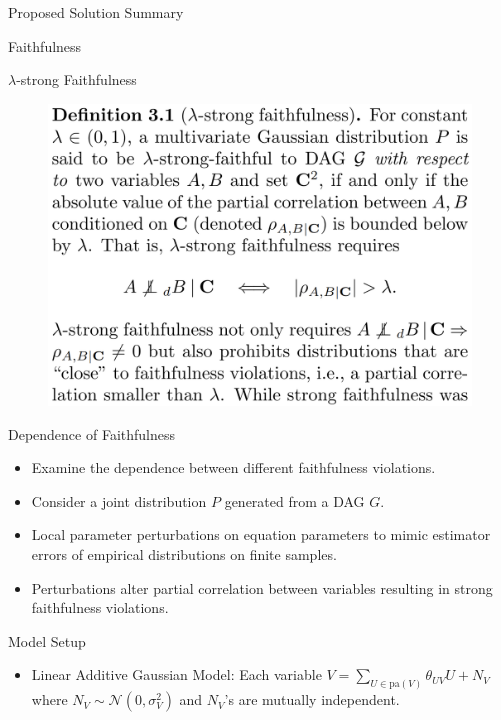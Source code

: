 \documentclass{beamer}
\begin{document}
\begin{frame}{Proposed Solution Summary}
\end{frame}

\begin{frame}{Faithfulness}
\end{frame}

\begin{frame}{$\lambda$-strong Faithfulness}
	\begin{figure}
		\includegraphics[scale=0.15]{imgs/def31.png}
	\end{figure}
\end{frame}

\begin{frame}{Dependence of Faithfulness}
	\begin{itemize}
		\item Examine the dependence between different faithfulness violations.
		\item Consider a joint distribution $ P $ generated from a DAG $ G $. 
		\item Local parameter perturbations on equation parameters to mimic estimator errors of empirical distributions on finite samples.
		\item Perturbations alter partial correlation between variables resulting in strong faithfulness violations.

	\end{itemize}
\end{frame}

\begin{frame}{Model Setup}
	\begin{itemize}
		\item Linear Additive Gaussian Model: Each variable $V = \sum_{U\in\text{pa}(V)} \theta_{UV}U + N_V$ where $N_V \sim \mathcal N(0,\sigma_V^2)$ and $N_V$’s are mutually independent.
	\end{itemize}
\end{frame}
\end{document}
